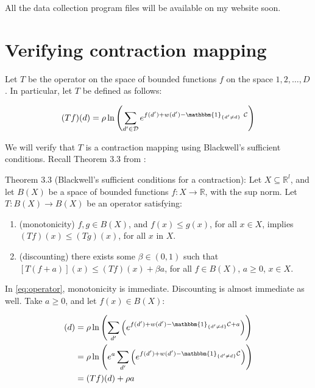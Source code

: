 \documentclass[]{article}
\begin{document}
All the data collection program files will be available on my website soon.

\section{Verifying contraction mapping}
\label{sec:contr_map}

Let $T$ be the operator on the space of bounded functions $f$ on the
space $1,2,\dots,D$. In particular, let $T$ be defined as follows:

\begin{equation}
    (Tf)(d) = \rho \ln\left( \sum_{d' \in \mathcal{D}} e^{f(d') + w(d') - \mathbbm{1}_{\{d'\neq d\}} \ \mathcal{C}} \right)    
    \label{eq:operator}
\end{equation}

We will verify that $T$ is a contraction mapping using Blackwell's
sufficient conditions. Recall Theorem 3.3 from
\citet{stokey1989recursive}:

Theorem 3.3 (Blackwell's sufficient conditions for a contraction): Let
$X \subseteq \mathbb{R}^l$, and let $B(X)$ be a space of bounded
functions $f:X\rightarrow \mathbb{R}$, with the sup norm. Let
$T: B(X) \rightarrow B(X)$ be an operator satisfying:

\begin{enumerate}
\def\labelenumi{\alph{enumi}.}
\itemsep1pt\parskip0pt
\item
  (monotonicity) $f, g \in B(X)$, and $f(x) \leq g(x)$, for all
  $x \in X$, implies $(Tf)(x) \leq (Tg)(x)$, for all $x$ in $X$.
\item
  (discounting) there exists some $\beta \in (0,1)$ such that
  $[T(f + a)](x) \leq (Tf)(x) + \beta a$, for all $f \in B(X) $,
  $a \geq 0$, $x\in X$.
\end{enumerate}

In \eqref{eq:operator}, monotonicity is immediate.  Discounting is almost
immediate as well. Take $a \geq 0$, and let $f(x) \in B(X)$:

\begin{align}
    [T(f + a)](d) &= \rho \ln \left( \sum_{d'} \left(e^{f(d') + w(d') - \mathbbm{1}_{\{d'\neq d\}}\mathcal{C} + a}\right)\right) \nonumber \\
    &= \rho \ln \left( e^a \sum_{d'} \left(e^{f(d') + w(d') - \mathbbm{1}_{\{d'\neq d\}}\mathcal{C}}\right)\right) \nonumber \\
    &= (Tf)(d) + \rho a \nonumber \\
\end{align}
\end{document}
